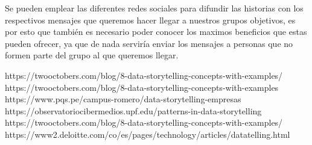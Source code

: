 \documentclass[preprint,12pt]{elsarticle}
\begin{document}
Se pueden emplear las diferentes redes sociales para difundir las historias con los respectivos mensajes que queremos hacer llegar a nuestros grupos objetivos, es por esto que también es necesario poder conocer los maximos beneficios que estas pueden ofrecer, ya que de nada serviría enviar los mensajes a personas que no formen parte del grupo al que queremos llegar.

	
	

	
	
	\newpage
	
	   \begin{thebibliography}{0}
                 https://twooctobers.com/blog/8-data-storytelling-concepts-with-examples/
                  https://twooctobers.com/blog/8-data-storytelling-concepts-with-examples
                   https://www.pqs.pe/campus-romero/data-storytelling-empresas
                   https://observatoriocibermedios.upf.edu/patterns-in-data-storytelling
                     https://twooctobers.com/blog/8-data-storytelling-concepts-with-examples/
                   https://www2.deloitte.com/co/es/pages/technology/articles/datatelling.html

         \end{thebibliography}

	
\end{document}
